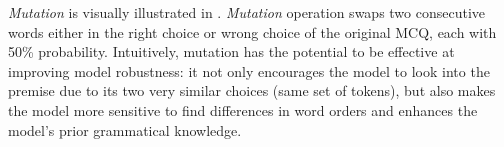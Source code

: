\textit{Mutation} is visually illustrated in . \textit{Mutation} operation swaps two consecutive words either in the right choice or wrong choice of the original MCQ, each with 50\% probability.
Intuitively, mutation has the potential to be 
effective at improving model robustness:
it not only encourages the model to look into the premise due to its
two very similar choices (same set of tokens), 
but also makes the model more
sensitive to find differences in word orders and 
enhances the model's prior grammatical knowledge. 

